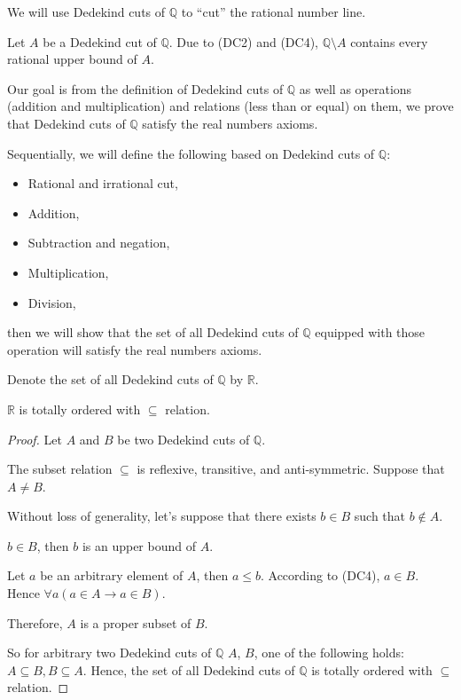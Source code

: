 We will use Dedekind cuts of $\mathbb{Q}$ to ``cut'' the rational number line.

Let $A$ be a Dedekind cut of $\mathbb{Q}$. Due to (DC2) and (DC4), $\mathbb{Q}\setminus A$ contains every rational upper bound of $A$.

Our goal is from the definition of Dedekind cuts of $\mathbb{Q}$ as well as operations (addition and multiplication) and relations (less than or equal) on them, we prove that Dedekind cuts of $\mathbb{Q}$ satisfy the real numbers axioms.

Sequentially, we will define the following based on Dedekind cuts of $\mathbb{Q}$:
\begin{itemize}
    \item Rational and irrational cut,
    \item Addition,
    \item Subtraction and negation,
    \item Multiplication,
    \item Division,
\end{itemize}

then we will show that the set of all Dedekind cuts of $\mathbb{Q}$ equipped with those operation will satisfy the real numbers axioms.

Denote the set of all Dedekind cuts of $\mathbb{Q}$ by $\mathbb{R}$.

\begin{theorem}
    $\mathbb{R}$ is totally ordered with $\subseteq$ relation.
\end{theorem}

\begin{proof}
    Let $A$ and $B$ be two Dedekind cuts of $\mathbb{Q}$.

    The subset relation $\subseteq$ is reflexive, transitive, and anti-symmetric.
    \bigskip
    Suppose that $A\ne B$.

    Without loss of generality, let's suppose that there exists $b\in B$ such that $b\notin A$.

    $b\in B$, then $b$ is an upper bound of $A$.

    Let $a$ be an arbitrary element of $A$, then $a\le b$. According to (DC4), $a\in B$. Hence $\forall a(a\in A\rightarrow a\in B)$.

    Therefore, $A$ is a proper subset of $B$.
    \bigskip

    So for arbitrary two Dedekind cuts of $\mathbb{Q}$ $A$, $B$, one of the following holds: $A\subseteq B, B\subseteq A$. Hence, the set of all Dedekind cuts of $\mathbb{Q}$ is totally ordered with $\subseteq$ relation.
\end{proof}

